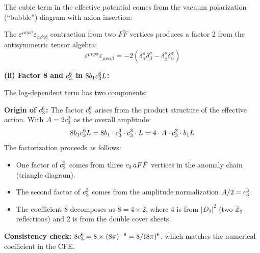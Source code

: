 The cubic term in the effective potential comes from the vacuum polarization 
(``bubble'') diagram with axion insertion:
\begin{center}
\end{center}
The $\varepsilon^{\mu\nu\rho\sigma}\varepsilon_{\alpha\beta\gamma\delta}$ contraction from two 
$F\tilde{F}$ vertices produces a factor 2 from the antisymmetric tensor algebra:
\begin{equation}
    \varepsilon^{\mu\nu\rho\sigma}\varepsilon_{\mu\nu\alpha\beta} = -2(\delta^\rho_\alpha\delta^\sigma_\beta - \delta^\rho_\beta\delta^\sigma_\alpha)
\end{equation}

\textbf{(ii) Factor 8 and $c_3^6$ in $8b_1c_3^6 L$:}

The log-dependent term has two components:

\textbf{Origin of $c_3^6$:} The factor $c_3^6$ arises from the product structure 
of the effective action. With $A = 2c_3^3$ as the overall amplitude:
\begin{equation}
    8b_1c_3^6 L = 8b_1 \cdot c_3^3 \cdot c_3^3 \cdot L
    = 4 \cdot A \cdot c_3^3 \cdot b_1 L
\end{equation}
The factorization proceeds as follows:
\begin{itemize}[leftmargin=1.5em, topsep=2pt, itemsep=1pt]
    \item One factor of $c_3^3$ comes from three $c_3\, aF\tilde{F}$ vertices 
        in the anomaly chain (triangle diagram).
    \item The second factor of $c_3^3$ comes from the amplitude normalization $A/2 = c_3^3$.
    \item The coefficient 8 decomposes as $8 = 4 \times 2$, where 4 is from $|D_2|^2$ 
        (two $\mathbb{Z}_2$ reflections) and 2 is from the double cover sheets.
\end{itemize}
\textbf{Consistency check:} $8c_3^6 = 8 \times (8\pi)^{-6} = 8/(8\pi)^6$, which matches 
the numerical coefficient in the CFE.

